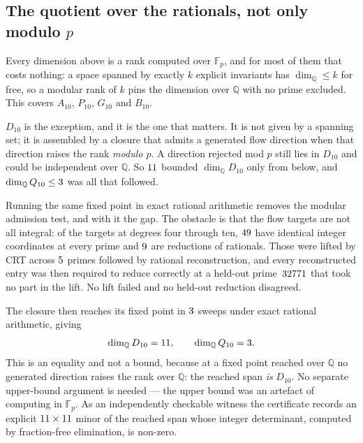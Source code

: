 \documentclass[11pt,a4paper]{article}
\begin{document}
\subsection{The quotient over the rationals, not only modulo $p$}
\label{sec:czero}

Every dimension above is a rank computed over $\mathbb{F}_p$, and for most of
them that costs nothing: a space spanned by exactly $k$ explicit invariants has
$\dim_{\mathbb{Q}} \le k$ for free, so a modular rank of $k$ pins the
dimension over $\mathbb{Q}$ with no prime excluded. This covers $A_{10}$,
$P_{10}$, $G_{10}$ and $B_{10}$.

$D_{10}$ is the exception, and it is the one that matters. It is not given by a
spanning set; it is assembled by a closure that admits a generated flow direction
when that direction raises the rank \emph{modulo $p$}. A direction rejected mod
$p$ still lies in $D_{10}$ and could be independent over $\mathbb{Q}$. So
$11$ bounded $\dim_{\mathbb{Q}} D_{10}$ only from below, and
$\dim_{\mathbb{Q}} Q_{10} \le 3$ was all that followed.

Running the same fixed point in exact rational arithmetic removes the modular
admission test, and with it the gap. The obstacle is that the flow targets are
not all integral: of the targets at degrees four through ten,
$49$ have identical integer coordinates at every prime and
$9$ are reductions of rationals. Those were lifted by CRT across
$5$ primes followed by rational reconstruction, and every
reconstructed entry was then required to reduce correctly at a held-out
prime~$32771$ that took no part in the lift. No lift failed and no
held-out reduction disagreed.

The closure then reaches its fixed point in $3$ sweeps under exact
rational arithmetic, giving
\begin{equation}
  \dim_{\mathbb{Q}} D_{10} = 11 ,
  \qquad
  \dim_{\mathbb{Q}} Q_{10} = 3 .
  \label{eq:czero}
\end{equation}
This is an equality and not a bound, because at a fixed point reached over
$\mathbb{Q}$ no generated direction raises the rank over $\mathbb{Q}$: the
reached span \emph{is} $D_{10}$. No separate upper-bound argument is needed --- the
upper bound was an artefact of computing in $\mathbb{F}_p$. As an independently
checkable witness the certificate records an explicit
$11 \times 11$ minor of the reached span whose integer
determinant, computed by fraction-free elimination, is non-zero.
\end{document}
